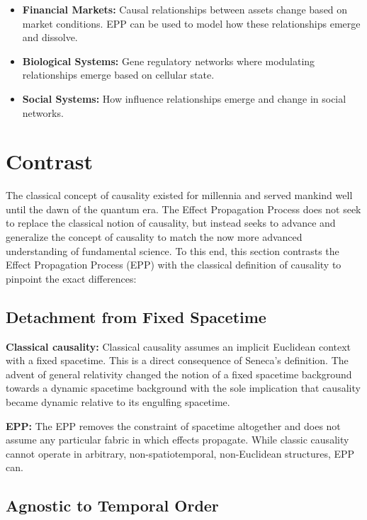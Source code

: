 \documentclass{article}
\begin{document}
\begin{itemize}
    \item \textbf{Financial Markets:}  Causal relationships between assets change based on market conditions. EPP can be used to model how these relationships emerge and dissolve.
    \item \textbf{Biological Systems:} Gene regulatory networks where modulating relationships emerge based on cellular state.
    \item \textbf{Social Systems:} How influence relationships emerge and change in social networks.
\end{itemize}

\newpage

\section{Contrast}
\label{sec:contrast}

The classical concept of causality existed for millennia and served mankind well until the dawn of the quantum era. The Effect Propagation Process does not seek to replace the classical notion of causality, but instead seeks to advance and generalize the concept of causality to match the now more advanced understanding of fundamental science. To this end, this section contrasts the Effect Propagation Process (EPP) with the classical definition of causality to pinpoint the exact differences:

\subsection{Detachment from Fixed Spacetime}

\textbf{Classical causality:} 
Classical causality assumes an implicit Euclidean context with a fixed spacetime. This is a direct consequence of Seneca’s definition. The advent of general relativity changed the notion of a fixed spacetime background towards a dynamic spacetime background with the sole implication that causality became dynamic relative to its engulfing spacetime.

\textbf{EPP:} 
The EPP removes the constraint of spacetime altogether and does not assume any particular fabric in which effects propagate. While classic causality cannot operate in arbitrary, non-spatiotemporal, non-Euclidean structures, EPP  can.


\subsection{Agnostic to Temporal Order}
\end{document}
